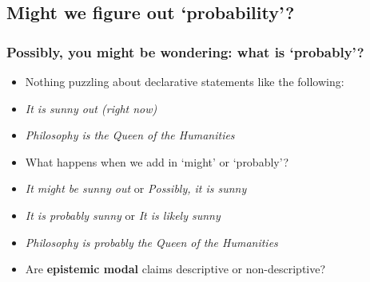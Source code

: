 \subsection{Might we figure out `probability'?}

\begin{frame}
\frametitle{Possibly, you might be wondering: what is `probably'?}

\begin{itemize}[<+->]

\item Nothing puzzling about declarative statements like the following:

\item[] \textit{It is sunny out (right now)}
\item[] \textit{Philosophy is the Queen of the Humanities}

\item What happens when we add in `might' or `probably'?

\item[] \textit{It might be sunny out} or \textit{Possibly, it is sunny}
\item[] \textit{It is probably sunny} or \textit{It is likely sunny} 
\item[] \textit{Philosophy is probably the Queen of the Humanities}

\item Are \textbf{epistemic modal} claims descriptive or non-descriptive?

\end{itemize}
\end{frame}

